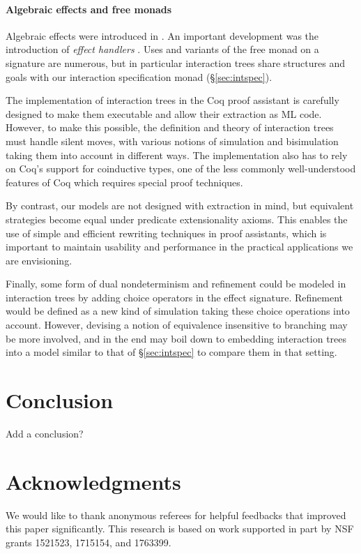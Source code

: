 \documentclass[sigplan,screen]{acmart}
\begin{document}
\paragraph{Algebraic effects and free monads}

Algebraic effects were introduced in \citet{effadq}.
An important development was
the introduction of \emph{effect handlers} \cite{eff}.
Uses and variants of the free monad
on a signature are numerous,
but in particular
interaction trees \cite{itree}
share structures and goals with
our interaction specification monad (\S\ref{sec:intspec}).

The implementation of interaction trees in the Coq proof
assistant is carefully designed to make them executable and
allow their extraction as ML code.
However, to make this possible,
the definition and theory of interaction trees
must handle silent moves,
with various notions of simulation and bisimulation
taking them into account in different ways.
The implementation also has to rely on
Coq's support for coinductive types, one of the less
commonly well-understood features of Coq which requires
special proof techniques.

By contrast, our models are not designed with extraction in mind,
but equivalent strategies become equal under
predicate extensionality axioms. This enables
the use of simple and efficient rewriting techniques
in proof assistants,
which is important to maintain usability and performance
in the practical applications we are envisioning.

Finally,
some form of dual nondeterminism and refinement could be modeled
in interaction trees by adding choice operators in the effect
signature. Refinement would be defined as a new kind
of simulation taking these choice operations into account.
However, devising a notion of equivalence insensitive to
branching may be more involved, and in the end may boil down to
embedding interaction trees into a model similar to that of
\S\ref{sec:intspec} to
compare them in that setting.


\section{Conclusion}
\label{sec:conclusion}

Add a conclusion? 

\section*{Acknowledgments}
We would like to thank anonymous referees for helpful feedbacks that
improved this paper significantly.  This research is based on work
supported in part by NSF grants 1521523, 1715154, and 1763399.




\end{document}
